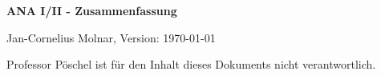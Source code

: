 \documentclass[paper=landscape,paper=a4,parskip=half,twocolumn,twoside=false,fleqn,DIV=calc]{scrartcl}
\numberwithin{equation}{aufgabe}
\begin{document}
\begin{center}
{\huge\bf ANA I/II - Zusammenfassung}

Jan-Cornelius Molnar, Version: \today\ \thistime

Professor Pöschel ist für den Inhalt dieses Dokuments nicht
verantwortlich.
\end{center}



























\end{document}
